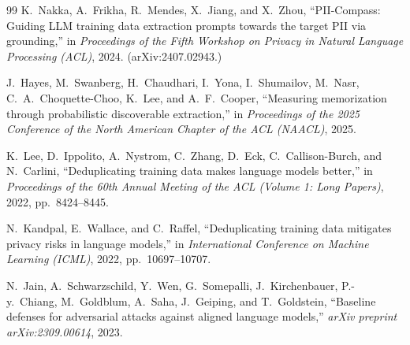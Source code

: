 \documentclass[letterpaper,twocolumn,10pt]{article}
\begin{document}
\begin{thebibliography}{99}
K.~Nakka, A.~Frikha, R.~Mendes, X.~Jiang, and X.~Zhou, ``PII-Compass: Guiding
LLM training data extraction prompts towards the target PII via grounding,''
in \emph{Proceedings of the Fifth Workshop on Privacy in Natural Language
Processing (ACL)}, 2024. (arXiv:2407.02943.)

J.~Hayes, M.~Swanberg, H.~Chaudhari, I.~Yona, I.~Shumailov, M.~Nasr,
C.~A.~Choquette-Choo, K.~Lee, and A.~F.~Cooper, ``Measuring memorization
through probabilistic discoverable extraction,'' in \emph{Proceedings of the
2025 Conference of the North American Chapter of the ACL (NAACL)}, 2025.

K.~Lee, D.~Ippolito, A.~Nystrom, C.~Zhang, D.~Eck, C.~Callison-Burch, and
N.~Carlini, ``Deduplicating training data makes language models better,'' in
\emph{Proceedings of the 60th Annual Meeting of the ACL (Volume 1: Long
Papers)}, 2022, pp.~8424--8445.

N.~Kandpal, E.~Wallace, and C.~Raffel, ``Deduplicating training data mitigates
privacy risks in language models,'' in \emph{International Conference on
Machine Learning (ICML)}, 2022, pp.~10697--10707.

N.~Jain, A.~Schwarzschild, Y.~Wen, G.~Somepalli, J.~Kirchenbauer, P.-y.~Chiang,
M.~Goldblum, A.~Saha, J.~Geiping, and T.~Goldstein, ``Baseline defenses for
adversarial attacks against aligned language models,'' \emph{arXiv preprint
arXiv:2309.00614}, 2023.

\end{thebibliography}
\end{document}
